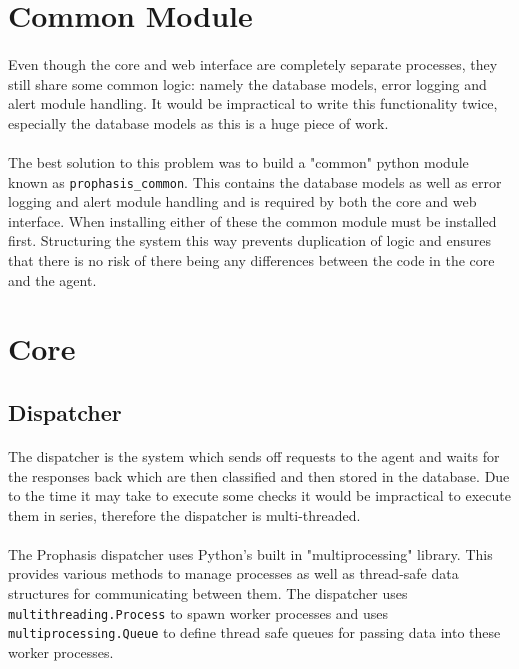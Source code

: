 \documentclass[bsc,logo,twoside,singlespacing]{infthesis}
\begin{document}
\section{Common Module}
\paragraph*{}
	Even though the core and web interface are completely separate processes, they
	still share some common logic: namely the database models, error logging and
	alert module handling.  It would be impractical to write this functionality
	twice, especially the database models as this is a huge piece of work.
	
\paragraph*{}
	The best solution to this problem was to build a "common" python module known
	as \texttt{prophasis\_common}.  This contains the database models as well as
	error logging and alert module handling and is required by both the core and
	web interface.  When installing either of these the common module must be
	installed first.  Structuring the system this way prevents duplication of
	logic and ensures that there is no risk of there being any differences between
	the code in the core and the agent.

\section{Core}
\subsection{Dispatcher}
\paragraph*{}
	The dispatcher is the system which sends off requests to the agent and waits
	for the responses back which are then classified and then stored in the
	database.  Due to the time it may take to execute some checks it would be
	impractical to execute them in series, therefore the dispatcher is
	multi-threaded.

\paragraph*{}
	The Prophasis dispatcher uses Python's built in "multiprocessing" library. This
	provides various methods to manage processes as well as thread-safe data
	structures for communicating between them.  The dispatcher uses
	\texttt{multithreading.Process} to spawn worker processes and uses
	\texttt{multiprocessing.Queue} to define thread safe queues for passing data
	into these worker processes.
\end{document}
